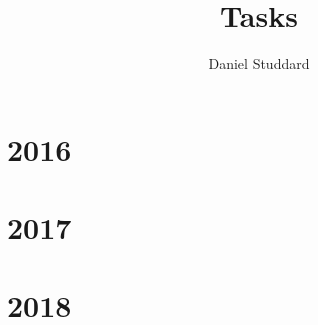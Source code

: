 \documentclass{report}
\author{Daniel Studdard}
\begin{document}
\title{Tasks}
\maketitle
\tableofcontents

\chapter{2016}













\chapter{2017}













\chapter{2018}











%
\end{document}
